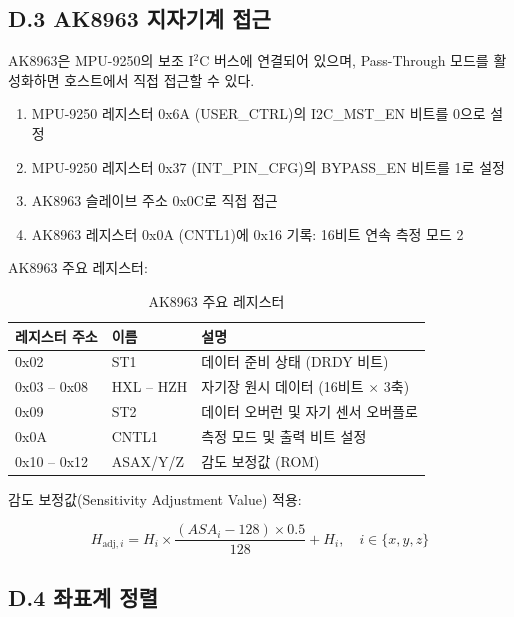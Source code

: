 \subsection*{D.3 AK8963 지자기계 접근}
 
AK8963은 MPU-9250의 보조 I$^2$C 버스에 연결되어 있으며,
Pass-Through 모드를 활성화하면 호스트에서 직접 접근할 수 있다.
 
\begin{enumerate}
    \item MPU-9250 레지스터 0x6A (USER\_CTRL)의 I2C\_MST\_EN 비트를 0으로 설정
    \item MPU-9250 레지스터 0x37 (INT\_PIN\_CFG)의 BYPASS\_EN 비트를 1로 설정
    \item AK8963 슬레이브 주소 0x0C로 직접 접근
    \item AK8963 레지스터 0x0A (CNTL1)에 0x16 기록: 16비트 연속 측정 모드 2
\end{enumerate}
 
AK8963 주요 레지스터:
 
\begin{table}[H]
    \centering
    \caption{AK8963 주요 레지스터}
    \label{tab:ak8963_reg}
    \begin{tabular}{lll}
        \toprule
        레지스터 주소 & 이름 & 설명 \\
        \midrule
        0x02 & ST1 & 데이터 준비 상태 (DRDY 비트) \\
        0x03 -- 0x08 & HXL -- HZH & 자기장 원시 데이터 (16비트 $\times$ 3축) \\
        0x09 & ST2 & 데이터 오버런 및 자기 센서 오버플로 \\
        0x0A & CNTL1 & 측정 모드 및 출력 비트 설정 \\
        0x10 -- 0x12 & ASAX/Y/Z & 감도 보정값 (ROM) \\
        \bottomrule
    \end{tabular}
\end{table}
 
감도 보정값(Sensitivity Adjustment Value) 적용:
 
\begin{equation}
    H_{\text{adj},i} = H_i \times \frac{(ASA_i - 128) \times 0.5}{128} + H_i, \quad i \in \{x, y, z\}
    \tag{D.4}
\end{equation}
 
\subsection*{D.4 좌표계 정렬}
 

